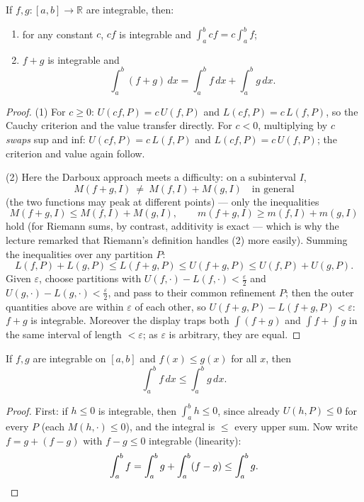 \documentclass[11pt]{report}
\begin{document}
\begin{thmbox}[Linearity]
If $f, g: [a,b] \to \mathbb{R}$ are integrable, then:
\begin{enumerate}[label=(\arabic*)]
    \item for any constant $c$, $cf$ is integrable and $\int_a^b cf = c\int_a^b f$;
    \item $f + g$ is integrable and
    \[
    \int_a^b (f + g)\,dx = \int_a^b f\,dx + \int_a^b g\,dx.
    \]
\end{enumerate}
\end{thmbox}

\begin{proof}
(1) For $c \geq 0$: $U(cf, P) = c\,U(f,P)$ and $L(cf,P) = c\,L(f,P)$, so the Cauchy criterion and the value transfer directly. For $c < 0$, multiplying by $c$ \emph{swaps} sup and inf: $U(cf,P) = c\,L(f,P)$ and $L(cf,P) = c\,U(f,P)$; the criterion and value again follow.

(2) Here the Darboux approach meets a difficulty: on a subinterval $I$,
\[
M(f+g, I) \ \neq\ M(f,I) + M(g,I) \quad \text{in general}
\]
(the two functions may peak at different points) --- only the inequalities
\[
M(f+g, I) \leq M(f,I) + M(g,I), \qquad m(f+g, I) \geq m(f,I) + m(g,I)
\]
hold (for Riemann sums, by contrast, additivity is exact --- which is why the lecture remarked that Riemann's definition handles (2) more easily). Summing the inequalities over any partition $P$:
\[
L(f,P) + L(g,P) \leq L(f+g, P) \leq U(f+g, P) \leq U(f,P) + U(g,P).
\]
Given $\varepsilon$, choose partitions with $U(f,\cdot) - L(f,\cdot) < \tfrac\varepsilon2$ and $U(g,\cdot) - L(g,\cdot) < \tfrac\varepsilon2$, and pass to their common refinement $P$; then the outer quantities above are within $\varepsilon$ of each other, so $U(f+g,P) - L(f+g,P) < \varepsilon$: $f+g$ is integrable. Moreover the display traps both $\int(f+g)$ and $\int f + \int g$ in the same interval of length $< \varepsilon$; as $\varepsilon$ is arbitrary, they are equal.
\end{proof}

\begin{thmbox}
If $f, g$ are integrable on $[a,b]$ and $f(x) \leq g(x)$ for all $x$, then
\[
\int_a^b f\,dx \leq \int_a^b g\,dx.
\]
\end{thmbox}

\begin{proof}
First: if $h \leq 0$ is integrable, then $\int_a^b h \leq 0$, since already $U(h, P) \leq 0$ for every $P$ (each $M(h, \cdot) \leq 0$), and the integral is $\leq$ every upper sum. Now write $f = g + (f - g)$ with $f - g \leq 0$ integrable (linearity):
\[
\int_a^b f = \int_a^b g + \int_a^b (f - g) \leq \int_a^b g. \qedhere
\]
\end{proof}
\end{document}
